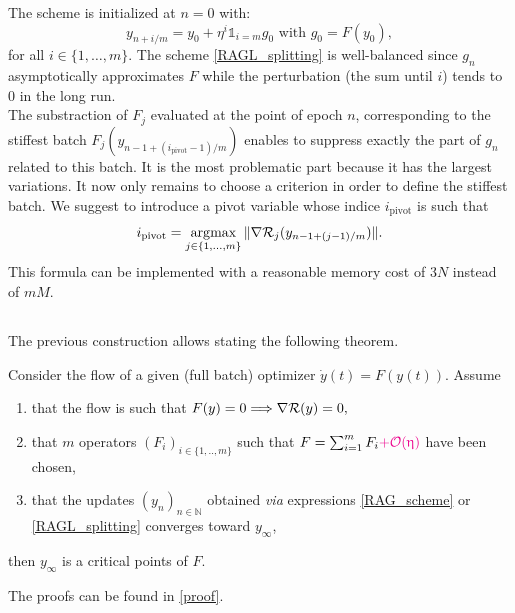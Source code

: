 \documentclass[article,authoryear,jmlmc]{beg_32}             %
\begin{document}
The scheme is initialized at $n=0$ with:
\begin{equation*}
	y_{n+i/m} = y_0 + \eta^i \mathds{1}_{i=m} g_0 \text{ with } g_0 = F(y_0),
\end{equation*}
for all $i \in \{1,\dots,m\}$. 
The scheme \eqref{RAGL_splitting} is well-balanced since $g_n$ asymptotically approximates $F$ while the perturbation (the sum until $i$) tends to 0 in the long run. \\
{The substraction of $F_j$ evaluated at the point of epoch $n$, corresponding to the stiffest batch $F_j\left(y_{n-1+(i_{\text{pivot}}-1)/m}\right)$ enables to suppress exactly the
part of $g_n$ related to this batch. It is the most problematic part because it has the largest variations. It now only remains to choose a criterion in order to define the
stiffest batch. We suggest to introduce a pivot variable whose indice  $i_{\text{pivot}}$ is such that
$$i_{\text{pivot}} = \operatorname*{\arg\!\textrm{max}}_{j\in\{1,...,m\}} \|\nabla \mathcal{R}_j(y_{n-1+(j-1)/m})\|.$$}
This formula can be implemented with a reasonable memory cost of $3N$ instead of $mM$.

\begin{remark}
\end{remark}

\subsection{}
\label{th_prop}

The previous construction allows stating the following theorem.
\begin{theorem}
\label{th}
  Consider the flow of a given (full batch) optimizer
$
\dot{y}(t) = F(y(t)).
$
Assume
\begin{enumerate}
\item  that the flow is such that 
$
F(y)=0 \Longrightarrow \nabla \mathcal{R}(y)=0,
$
\item that $m$ operators $(F_i)_{i\in\{1,..,m\}}$
such that $F=\sum_{i=1}^m F_i \textcolor{magenta}{+\mathcal{O}(\upeta)}$ have been chosen, 
\item that the updates $(y_n)_{n\in\mathbb{N}}$ obtained {\em via} expressions \eqref{RAG_scheme} or \eqref{RAGL_splitting}  converges toward $y_\infty$,
\end{enumerate}
 then $y_\infty$ is a critical points of $F$. 
\end{theorem}
The proofs can be found in \ref{proof}.\\
\end{document}
